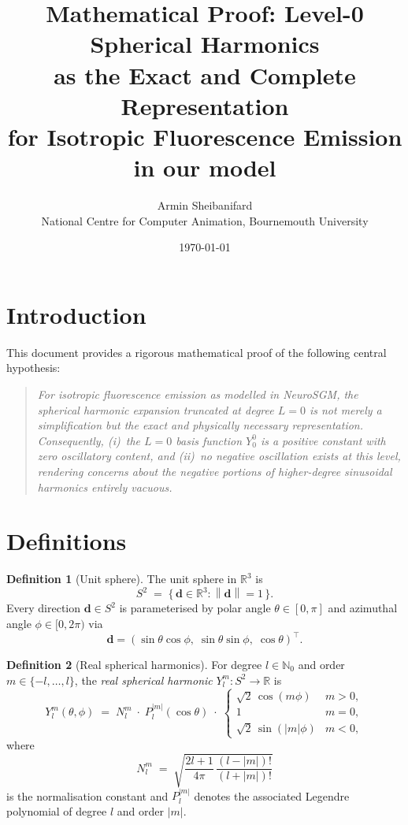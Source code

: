 \documentclass[12pt, a4paper]{article}
\title{%
  \textbf{Mathematical Proof: Level-0 Spherical Harmonics}\\[4pt]
  \large as the Exact and Complete Representation\\
  for Isotropic Fluorescence Emission in our model
}
\author{Armin Sheibanifard\\
\small National Centre for Computer Animation, Bournemouth University}
\date{\today}
\theoremstyle{definition}
\newtheorem{definition}{Definition}[section]
\theoremstyle{plain}
\theoremstyle{remark}
\newcommand{\R}{\mathbb{R}}
\newcommand{\Stwo}{S^2}
\newcommand{\norm}[1]{\left\lVert#1\right\rVert}
\begin{document}
\maketitle
\tableofcontents
\bigskip

\section{Introduction}

This document provides a rigorous mathematical proof of the following
central hypothesis:

\begin{quote}
\itshape
For isotropic fluorescence emission as modelled in NeuroSGM, the
spherical harmonic expansion truncated at degree $L=0$ is not merely
a simplification but the \emph{exact} and \emph{physically necessary}
representation.  Consequently, (i)~the $L=0$ basis function
$Y_0^0$ is a positive constant with zero oscillatory content, and
(ii)~no negative oscillation exists at this level, rendering concerns
about the negative portions of higher-degree sinusoidal harmonics
entirely vacuous.
\end{quote}

\section{Definitions}

\begin{definition}[Unit sphere]
\label{def:sphere}
The unit sphere in $\R^3$ is
\[
  \Stwo \;=\; \bigl\{\,\mathbf{d}\in\R^3 : \norm{\mathbf{d}}=1\,\bigr\}.
\]
Every direction $\mathbf{d}\in\Stwo$ is parameterised by polar angle
$\theta\in[0,\pi]$ and azimuthal angle $\phi\in[0,2\pi)$ via
\[
  \mathbf{d} = (\sin\theta\cos\phi,\;\sin\theta\sin\phi,\;\cos\theta)^\top.
\]
\end{definition}

\begin{definition}[Real spherical harmonics]
\label{def:sh}
For degree $l\in\mathbb{N}_0$ and order $m\in\{-l,\ldots,l\}$, the
\emph{real spherical harmonic} $Y_l^m : \Stwo\to\R$ is
\[
  Y_l^m(\theta,\phi)
  \;=\;
  N_l^m\;\cdot\;P_l^{|m|}(\cos\theta)\;\cdot\;
  \begin{cases}
    \sqrt{2}\,\cos(m\phi)   & m > 0,\\[2pt]
    1                        & m = 0,\\[2pt]
    \sqrt{2}\,\sin(|m|\phi) & m < 0,
  \end{cases}
\]
where
\[
  N_l^m \;=\; \sqrt{\frac{2l+1}{4\pi}\,\frac{(l-|m|)!}{(l+|m|)!}}
\]
is the normalisation constant and $P_l^{|m|}$ denotes the associated
Legendre polynomial of degree $l$ and order $|m|$.
\end{definition}
\end{document}
